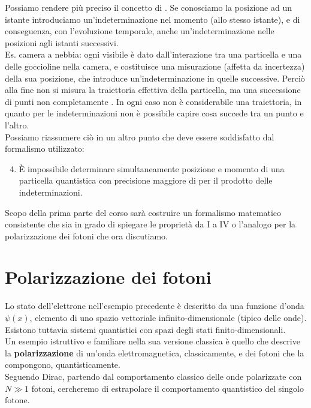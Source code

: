\documentclass[FisicaTeorica.tex]{subfiles}
\begin{document}
Possiamo rendere più preciso il concetto di . 
Se conosciamo la posizione ad un istante introduciamo un'indeterminazione nel momento (allo stesso istante), e di conseguenza, con l'evoluzione temporale, anche un'indeterminazione nelle posizioni agli istanti successivi.\\
Es. camera a nebbia: ogni  visibile è dato dall'interazione tra una particella e una delle goccioline nella camera, e costituisce una misurazione (affetta da incertezza) della sua posizione, che introduce un'indeterminazione in quelle successive. Perciò alla fine non si misura la traiettoria effettiva della particella, ma una successione di punti non completamente .
In ogni caso non è considerabile una traiettoria, in quanto per le indeterminazioni non è possibile capire cosa succede tra un punto e l'altro.\\
Possiamo riassumere ciò in un altro punto che deve essere soddisfatto dal formalismo utilizzato:
\begin{enumerate}[label=\Roman*.]
\setcounter{enumi}{3}
    \item È impossibile   determinare simultaneamente posizione e momento di una particella quantistica con precisione maggiore di  per il prodotto delle indeterminazioni. 
\end{enumerate}

Scopo della prima parte del corso sarà costruire un formalismo matematico consistente che sia in grado di spiegare le proprietà da I a IV o l'analogo per la polarizzazione dei fotoni che ora discutiamo.\\

\section{Polarizzazione dei fotoni} 
Lo stato dell'elettrone nell'esempio precedente è descritto da una funzione d'onda $\psi(x)$, elemento di uno spazio vettoriale infinito-dimensionale (tipico delle onde).\\
Esistono tuttavia sistemi quantistici con spazi degli stati finito-dimensionali.\\
Un esempio istruttivo e familiare nella sua versione classica è quello che descrive la \textbf{polarizzazione} di un'onda elettromagnetica, classicamente, e dei fotoni che la compongono, quantisticamente.\\
Seguendo Dirac, partendo dal comportamento classico delle onde polarizzate con $N\gg 1$ fotoni, cercheremo di estrapolare il comportamento quantistico del singolo fotone.\\
\end{document}
